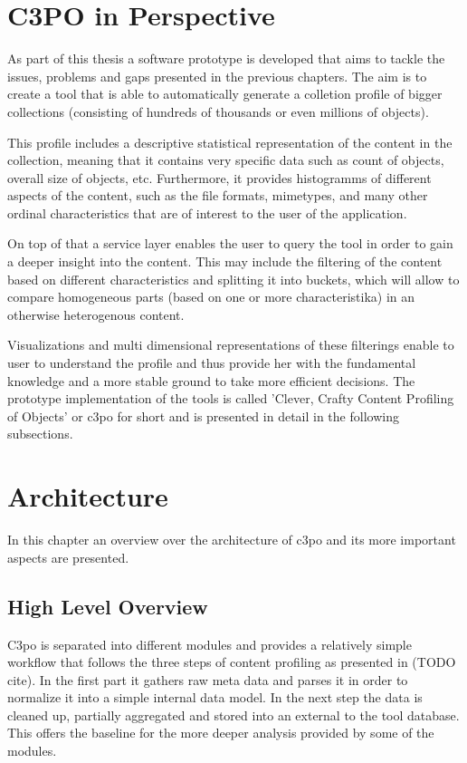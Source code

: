 \section{C3PO in Perspective}
As part of this thesis a software prototype is developed that aims to tackle the issues, problems and gaps presented in the previous chapters. The aim is to create a tool that is able to automatically generate a colletion profile of bigger collections (consisting of hundreds of thousands or even millions of objects). 

This profile includes a descriptive statistical representation of the content in the collection, meaning that it contains very specific data such as count of objects, overall size of objects, etc. Furthermore, it provides histogramms of different aspects of the content, such as the file formats, mimetypes, and many other ordinal characteristics that are of interest to the user of the application.

On top of that a service layer enables the user to query the tool in order to gain a deeper insight into the content. This may include the filtering of the content based on different characteristics and splitting it into buckets, which will allow to compare homogeneous parts (based on one or more characteristika) in an otherwise heterogenous content. 

Visualizations and multi dimensional representations of these filterings enable to user to understand the profile and thus provide her with the fundamental knowledge and a more stable ground to take more efficient decisions.
The prototype implementation of the tools is called 'Clever, Crafty Content Profiling of Objects' or c3po for short and is presented in detail in the following subsections.

\section{Architecture}
In this chapter an overview over the architecture of c3po and its more important aspects are presented.

\subsection{High Level Overview}
C3po is separated into different modules and provides a relatively simple workflow that follows the three steps of content profiling as presented in (TODO cite). In the first part it gathers raw meta data and parses it in order to normalize it into a simple internal data model. In the next step the data is cleaned up, partially aggregated and stored into an external to the tool database.
This offers the baseline for the more deeper analysis provided by some of the modules.


